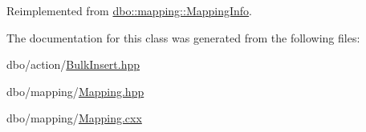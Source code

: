 Reimplemented from \hyperlink{classdbo_1_1mapping_1_1_mapping_info_a1b52b4f58c49b0c7bd64968bae692846}{dbo\+::mapping\+::\+Mapping\+Info}.



The documentation for this class was generated from the following files\+:\begin{DoxyCompactItemize}
\item 
dbo/action/\hyperlink{_bulk_insert_8hpp}{Bulk\+Insert.\+hpp}\item 
dbo/mapping/\hyperlink{_mapping_8hpp}{Mapping.\+hpp}\item 
dbo/mapping/\hyperlink{_mapping_8cxx}{Mapping.\+cxx}\end{DoxyCompactItemize}
